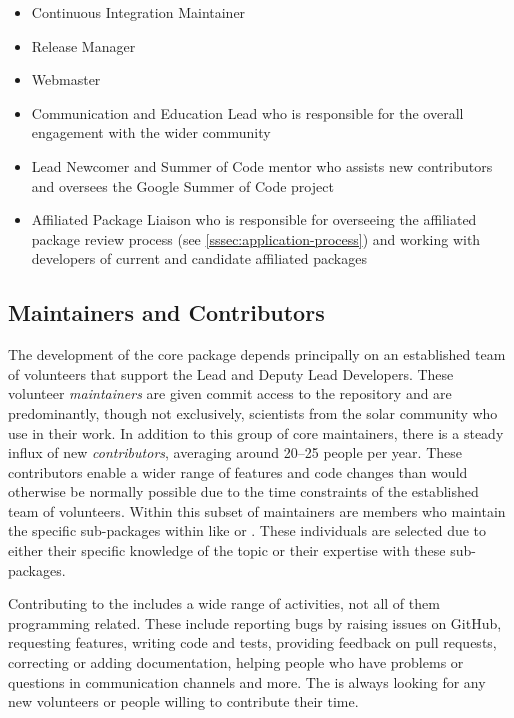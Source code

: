 \begin{itemize}
    \item Continuous Integration Maintainer
    \item Release Manager
    \item Webmaster
    \item Communication and Education Lead who is responsible for the overall engagement with the wider community
    \item Lead Newcomer and Summer of Code mentor who assists new contributors and oversees the Google Summer of Code project
    \item Affiliated Package Liaison who is responsible for overseeing the affiliated package review process (see \autoref{sssec:application-process}) and working with developers of current and candidate affiliated packages
\end{itemize}

\subsection{Maintainers and Contributors}
\label{ssec:maintainers-and-contributors}

The development of the \sunpypkg core package depends principally on an established team of volunteers that support the Lead and Deputy Lead Developers.
These volunteer \textit{maintainers} are given commit access to the \sunpypkg repository and are predominantly, though not exclusively, scientists from the solar community who use \sunpypkg in their work.
In addition to this group of core maintainers, there is a steady influx of new \textit{contributors}, averaging around 20--25 people per year.
These contributors enable a wider range of features and code changes than would otherwise be normally possible due to the time constraints of the established team of volunteers.
Within this subset of maintainers are members who maintain the specific sub-packages within \sunpypkg like  or .
These individuals are selected due to either their specific knowledge of the topic or their expertise with these sub-packages.

Contributing to the \sunpyproj includes a wide range of activities, not all of them programming related.
These include reporting bugs by raising issues on GitHub, requesting features, writing code and tests, providing feedback on pull requests, correcting or adding documentation, helping people who have problems or questions in communication channels and more.
The \sunpyproj is always looking for any new volunteers or people willing to contribute their time.
